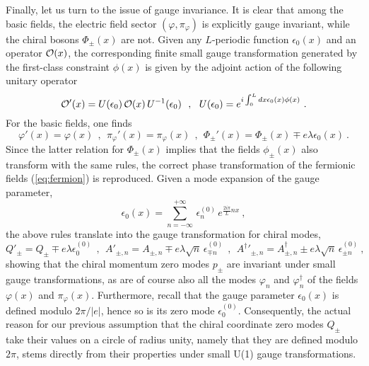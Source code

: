\documentclass[a4paper,11pt]{article}
\begin{document}
Finally, let us turn to the issue of gauge invariance. It is clear that
among the basic fields, the electric field sector $(\varphi,\pi_\varphi)$
is explicitly gauge invariant, while the chiral bosons $\Phi_\pm(x)$ are not.
Given any $L$-periodic function $\epsilon_0(x)$ and an operator ${\cal O}(x)$, 
the corresponding finite small gauge transformation generated by the 
first-class constraint $\phi(x)$ is given by the adjoint action of the
following unitary operator
\begin{equation}
{\cal O}'(x)=U(\epsilon_0)\,{\cal O}(x)\,U^{-1}(\epsilon_0)\ \ ,\ \ 
U(\epsilon_0)=e^{i\int_0^L dx \epsilon_0(x)\phi(x)}\ .
\end{equation}
For the basic fields, one finds
\begin{equation}
\varphi'(x)=\varphi(x)\ \ ,\ \ 
\pi_\varphi'(x)=\pi_\varphi(x)\ \ ,\ \ 
\Phi_\pm'(x)=\Phi_\pm(x) \mp e\lambda\epsilon_0(x)\ .
\end{equation}
Since the latter relation for $\Phi_\pm(x)$ implies that the fields 
$\phi_\pm(x)$ also transform with the same rules, the correct phase 
transformation of the fermionic fields (\ref{eq:fermion}) is reproduced.
Given a mode expansion of the gauge parameter,
\begin{equation}
\epsilon_0(x)=\sum_{n=-\infty}^{+\infty}\,
\epsilon^{(0)}_n\,e^{\frac{2i\pi}{L}nx}\ ,
\end{equation}
the above rules translate into the gauge transformation for chiral modes,
\begin{equation}
Q'_\pm=Q_\pm\mp e\lambda\epsilon^{(0)}_0\ \ ,\ \ 
A'_{\pm,n}=A_{\pm,n}\mp e\lambda\sqrt{n}\,\epsilon^{(0)}_{\mp n}\ \ ,\ \ 
{A^\dagger}'_{\pm,n}=A^\dagger_{\pm,n}\pm e\lambda\sqrt{n}\,
\epsilon^{(0)}_{\pm n}\ ,
\end{equation}
showing that the chiral momentum zero modes $p_\pm$ are invariant under 
small gauge transformations, as are of course also all the modes $\varphi_n$ and
$\varphi^\dagger_n$ of the fields $\varphi(x)$ and $\pi_\varphi(x)$. 
Furthermore, recall that the gauge parameter $\epsilon_0(x)$
is defined modulo $2\pi/|e|$, hence so is its zero mode $\epsilon^{(0)}_0$.
Consequently, the actual reason for our previous assumption that the
chiral coordinate zero modes $Q_\pm$ take their values on a circle
of radius unity, namely that they are defined modulo $2\pi$, stems
directly from their properties under small U(1) gauge transformations.
\end{document}
